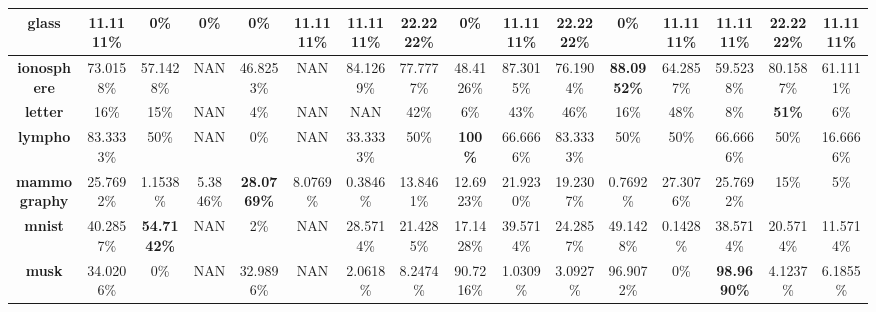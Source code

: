 \begin{table}
{\begin{tabular}{|c|c|c|c|c|c|c|c|c|c|c|c|c|c|c|c|}
		\textbf{glass}            & 11.1111\%          & 0\%                & 0\%             & 0\%                & 11.1111\%     & 11.1111\%          & \textbf{22.2222\%} & 0\%                & 11.1111\%    & \textbf{22.2222\%} & 0\%                & 11.1111\%          & 11.1111\%          & \textbf{22.2222\%} & 11.1111\%    \\ \hline
		\textbf{ionosphere}       & 73.0158\%          & 57.1428\%          & NAN             & 46.8253\%          & NAN           & 84.1269\%          & 77.7777\%          & 48.4126\%          & 87.3015\%    & 76.1904\%          & \textbf{88.0952\%} & 64.2857\%          & 59.5238\%          & 80.1587\%          & 61.1111\%    \\ \hline
		\textbf{letter}           & 16\%               & 15\%               & NAN             & 4\%                & NAN           & NAN                & 42\%               & 6\%                & 43\%         & 46\%               & 16\%               & 48\%               & 8\%                & \textbf{51\%}      & 6\%          \\ \hline
		\textbf{lympho}           & 83.3333\%          & 50\%               & NAN             & 0\%                & NAN           & 33.3333\%          & 50\%               & \textbf{100\%}     & 66.6666\%    & 83.3333\%          & 50\%               & 50\%               & 66.6666\%          & 50\%               & 16.6666\%    \\ \hline
		\textbf{mammography}      & 25.7692\%          & 1.1538\%           & 5.3846\%        & \textbf{28.0769\%} & 8.0769\%      & 0.3846\%           & 13.8461\%          & 12.6923\%          & 21.9230\%    & 19.2307\%          & 0.7692\%           & 27.3076\%          & 25.7692\%          & 15\%               & 5\%          \\ \hline
		\textbf{mnist}            & 40.2857\%          & \textbf{54.7142\%} & NAN             & 2\%                & NAN           & 28.5714\%          & 21.4285\%          & 17.1428\%          & 39.5714\%    & 24.2857\%          & 49.1428\%          & 0.1428\%           & 38.5714\%          & 20.5714\%          & 11.5714\%    \\ \hline
		\textbf{musk}             & 34.0206\%          & 0\%                & NAN             & 32.9896\%          & NAN           & 2.0618\%           & 8.2474\%           & 90.7216\%          & 1.0309\%     & 3.0927\%           & 96.9072\%          & 0\%                & \textbf{98.9690\%} & 4.1237\%           & 6.1855\%     \\ \hline

\end{tabular}}
\end{table}
